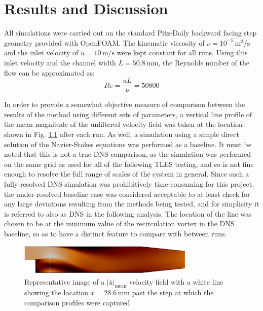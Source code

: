 \chapter{Results and Discussion}


All simulations were carried out on the standard Pitz-Daily backward facing step geometry provided with OpenFOAM. The kinematic viscosity of $\nu=10^{-5}\,\mathrm{m}^2/\mathrm{s}$ and the inlet velocity of $u=10\,\mathrm{m}/\mathrm{s}$ were kept constant for all runs. Using this inlet velocity and the channel width $L=50.8\,\mathrm{mm}$, the Reynolds number of the flow can be approximated as: $$ Re=\frac{uL}{\nu}=50800$$

In order to provide a somewhat objective measure of comparison between the results of the method using different sets of parameters, a vertical line profile of the mean magnitude of the unfiltered velocity field was taken at the location shown in Fig. \ref{fig:line_location} after each run. As well, a simulation using a simple direct solution of the Navier-Stokes equations was performed as a baseline. It must be noted that this is not a true DNS comparison, as the simulation was performed on the same grid as used for all of the following TLES testing, and so is not fine enough to resolve the full range of scales of the system in general. Since such a fully-resolved DNS simulation was prohibitively time-consuming for this project, the under-resolved baseline case was considered acceptable to at least check for any large deviations resulting from the methods being tested, and for simplicity it is referred to also as DNS in the following analysis. The location of the line was chosen to be at the minimum value of the recirculation vortex in the DNS baseline, so as to have a distinct feature to compare with between runs.

\begin{figure}[!b]
\centering
\includegraphics[width=0.75\textwidth]{figures/line_location.pdf}
\caption{Representative image of a $|\bar{u}|_{\mathrm{mean}}$ velocity field with a white line showing the location $x=28.6\,\mathrm{mm}$ past the step at which the comparison profiles were captured}
\label{fig:line_location}
\end{figure}

